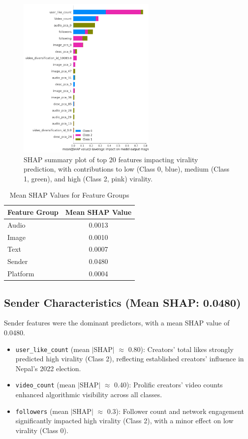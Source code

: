 \documentclass[12pt,a4paper]{report}
\begin{document}
\begin{figure}[h]
    \centering
    \includegraphics[width=0.60\textwidth]{figures/RQ1/SHAP_first_test_Plot.png}
    \caption{SHAP summary plot of top 20 features impacting virality prediction, with contributions to low (Class 0, blue), medium (Class 1, green), and high (Class 2, pink) virality.}
    \label{fig:shap_summary}
\end{figure}


\begin{table}[h]
    \centering
    \caption{Mean SHAP Values for Feature Groups}
    \label{tab:shap_values}
    \begin{tabular}{l S[table-format=1.4]}
        \toprule
        \textbf{Feature Group} & {\textbf{Mean SHAP Value}} \\
        \midrule
        Audio  & 0.0013 \\
        Image  & 0.0010 \\
        Text   & 0.0007 \\
        Sender & 0.0480 \\
        Platform & 0.0004 \\
        \bottomrule
    \end{tabular}
\end{table}

\subsection{Sender Characteristics (Mean SHAP: 0.0480)}
Sender features were the dominant predictors, with a mean SHAP value of 0.0480.
\begin{itemize}
    \item \texttt{user\_like\_count} (mean $|$SHAP$|$ $\approx$ 0.80): Creators’ total likes strongly predicted high virality (Class 2), reflecting established creators’ influence in Nepal’s 2022 election.
    \item \texttt{video\_count} (mean $|$SHAP$|$ $\approx$ 0.40): Prolific creators’ video counts enhanced algorithmic visibility across all classes.
    \item \texttt{followers} (mean $|$SHAP$|$ $\approx$ 0.3): Follower count and network engagement significantly impacted high virality (Class 2), with a minor effect on low virality (Class 0).
\end{itemize}
\end{document}
